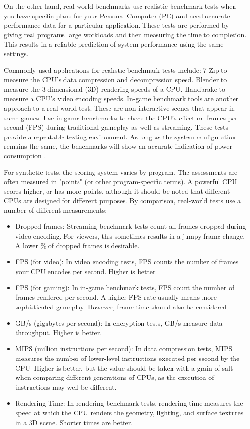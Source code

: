 On the other hand, real-world benchmarks use realistic benchmark tests when you have specific plans
for your Personal Computer (PC) and need accurate performance data for a particular application.
These tests are performed by giving real programs large workloads and then measuring the time to completion. 
This results in a reliable prediction of system performance using the same settings.

Commonly used applications for realistic benchmark tests include:
7-Zip to measure the CPU's data compression and decompression speed.
Blender to measure the 3 dimensional (3D) rendering speeds of a CPU.
Handbrake to measure a CPU's video encoding speeds.
In-game benchmark tools are another approach to a real-world test. 
These are non-interactive scenes that appear in some games. 
Use in-game benchmarks to check the CPU's effect on frames per second (FPS) during traditional gameplay as well as streaming.
These tests provide a repeatable testing environment. 
As long as the system configuration remains the same, the benchmarks will show an accurate indication of power consumption
\cite{Anovervi34:online}.

For synthetic tests, the scoring system varies by program. 
The assessments are often measured in "points" (or other program-specific terms). 
A powerful CPU scores higher, or has more points, although it should be noted that different CPUs are designed for different purposes.
By comparison, real-world tests use a number of different measurements:

\begin{itemize}
    \item Dropped frames: Streaming benchmark tests count all frames dropped during video encoding. 
    For viewers, this sometimes results in a jumpy frame change. 
    A lower \% of dropped frames is desirable.
    \item FPS (for video): In video encoding tests, FPS counts the number of frames your CPU encodes per second. Higher is better.
    \item FPS (for gaming): In in-game benchmark tests, FPS count the number of frames rendered per second. 
    A higher FPS rate usually means more sophisticated gameplay. However, frame time should also be considered.
    \item GB/s (gigabytes per second): In encryption tests, GB/s measure data throughput. Higher is better.
    \item MIPS (million instructions per second): In data compression tests, 
    MIPS measures the number of lower-level instructions executed per second by the CPU. 
    Higher is better, but the value should be taken with a grain of salt when comparing different generations of CPUs, 
    as the execution of instructions may well be different.
    \item Rendering Time: In rendering benchmark tests, rendering time measures the speed at which the CPU renders the geometry,
    lighting, and surface textures in a 3D scene. Shorter times are better.
\end{itemize}







